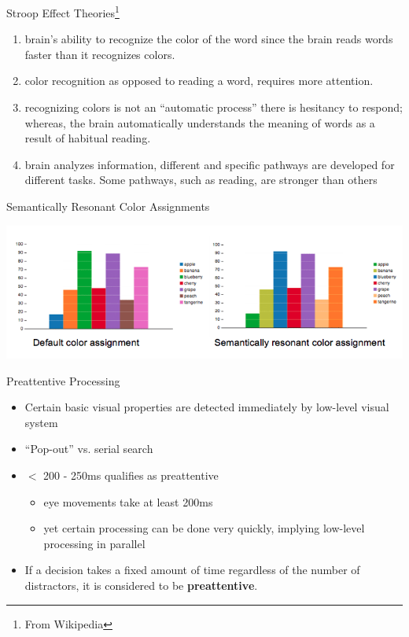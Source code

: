 \documentclass{beamer}
\begin{document}
\begin{frame}{Stroop Effect Theories\footnote{From Wikipedia}}
    \begin{enumerate}
        \item brain's ability to recognize the color of the word since the brain reads words faster than it recognizes colors.
        \item color recognition as opposed to reading a word, requires more attention.
        \item recognizing colors is not an ``automatic process'' there is hesitancy to respond; whereas, the brain automatically understands the meaning of words as a result of habitual reading.
        \item brain analyzes information, different and specific pathways are developed for different tasks. Some pathways, such as reading, are stronger than others
    \end{enumerate}
\end{frame}  

\begin{frame}{Semantically Resonant Color Assignments}
    \begin{center}
        \includegraphics[scale=0.45]{fruitcharts.png}
    \end{center}
\end{frame}

\begin{frame}{Preattentive Processing} 
    \begin{itemize}
        \item Certain basic visual properties are detected immediately by low-level visual system
        \item ``Pop-out'' vs. serial search
        \item $<$ 200 - 250ms qualifies as preattentive 
        \begin{itemize}
            \item eye movements take at least 200ms
            \item yet certain processing can be done very quickly, implying low-level processing in parallel
        \end{itemize}
        \item If a decision takes a fixed amount of time regardless of the number of distractors, it is considered to be {\bf preattentive}.
    \end{itemize}
\end{frame}  
\end{document}
